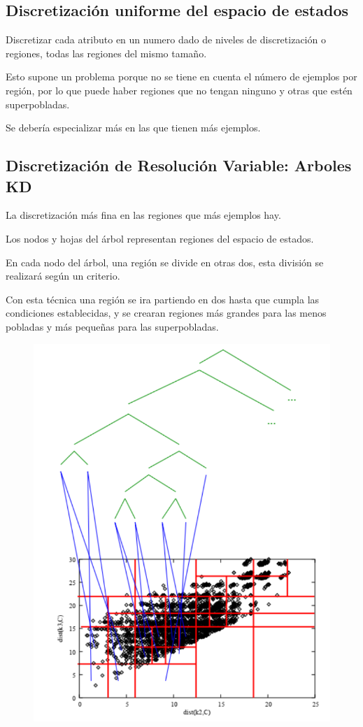 \documentclass[12pt]{report} %
\begin{document}
\subsection{Discretización uniforme del espacio de estados}
Discretizar cada atributo en un numero dado de niveles de discretización o regiones, todas las regiones del mismo tamaño.

Esto supone un problema porque no se tiene en cuenta el número de ejemplos por región, por lo que puede haber regiones que no tengan ninguno y otras que estén superpobladas.

Se debería especializar más en las que tienen más ejemplos.

\subsection{Discretización de Resolución Variable: Arboles KD}
La discretización más fina en las regiones que más ejemplos hay.

Los nodos y hojas del árbol representan regiones del espacio de estados.

En cada nodo del árbol, una región se divide en otras dos, esta división se realizará según un criterio.

Con esta técnica una región se ira partiendo en dos hasta que cumpla las condiciones establecidas, y se crearan regiones más grandes para las menos pobladas y más pequeñas para las superpobladas.

\begin{figure}[H]
  {\includegraphics[scale=.25]{2021-04-24 14_09_21-refuerzo.pdf - Foxit Reader.png}}
\end{figure}
\end{document}
